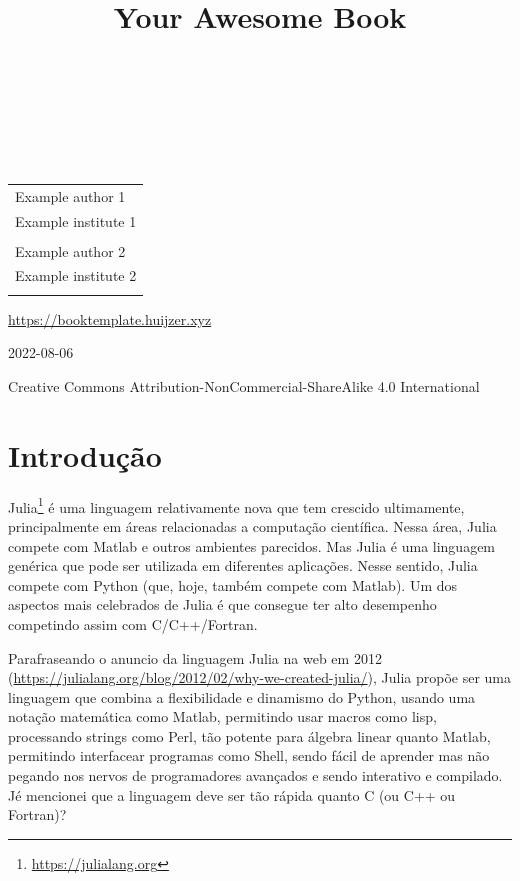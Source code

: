 \documentclass[
  notoc %
]{tufte-book}
\title{Your Awesome Book}
\author{\noindent{Example author 1}\\[3mm] \noindent{Example author
2}\\[3mm] }
\date{}
\DeclareRobustCommand{\href}[2]{#2\footnote{\url{#1}}}
\begin{document}
\makeatletter
\thispagestyle{empty}
\vfill
{\Huge\bf
\noindent
\@title
}\\[1in]
{\Large
\noindent
\@author
}
\makeatother

\makeatletter
\newpage
\thispagestyle{empty}
\vfill
{\noindent
\begin{tabular}{l} Example author 1\\ Example institute 1\\ \\ Example author 2\\ Example institute 2\\ \\ \end{tabular}
}
\vfill
{\small
\url{https://booktemplate.huijzer.xyz}

2022-08-06

Creative Commons Attribution-NonCommercial-ShareAlike 4.0 International
}
\makeatother


\frontmatter
\mainmatter
{}

\setcounter{tocdepth}{1}
\tableofcontents

\justifying

\setlength{\parindent}{0pt}

\hypertarget{sec:intro}{%
\chapter{Introdução}\label{sec:intro}}

\href{https://julialang.org}{Julia} é uma linguagem relativamente nova
que tem crescido ultimamente, principalmente em áreas relacionadas a
computação científica. Nessa área, Julia compete com Matlab e outros
ambientes parecidos. Mas Julia é uma linguagem genérica que pode ser
utilizada em diferentes aplicações. Nesse sentido, Julia compete com
Python (que, hoje, também compete com Matlab). Um dos aspectos mais
celebrados de Julia é que consegue ter alto desempenho competindo assim
com C/C++/Fortran.

Parafraseando o anuncio da linguagem Julia na web em 2012
(\url{https://julialang.org/blog/2012/02/why-we-created-julia/}), Julia
propõe ser uma linguagem que combina a flexibilidade e dinamismo do
Python, usando uma notação matemática como Matlab, permitindo usar
macros como lisp, processando strings como Perl, tão potente para
álgebra linear quanto Matlab, permitindo interfacear programas como
Shell, sendo fácil de aprender mas não pegando nos nervos de
programadores avançados e sendo interativo e compilado. Jé mencionei que
a linguagem deve ser tão rápida quanto C (ou C++ ou Fortran)?
\end{document}
